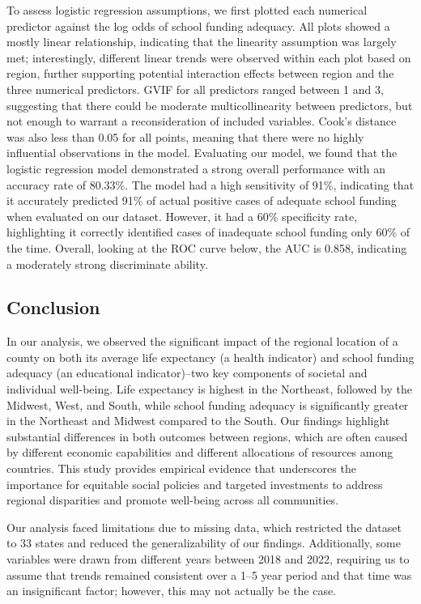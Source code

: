\documentclass[
  10pt,
  letterpaper,
  DIV=11,
  numbers=noendperiod]{scrartcl}
\begin{document}
To assess logistic regression assumptions, we first plotted each
numerical predictor against the log odds of school funding adequacy. All
plots showed a mostly linear relationship, indicating that the linearity
assumption was largely met; interestingly, different linear trends were
observed within each plot based on region, further supporting potential
interaction effects between region and the three numerical predictors.
GVIF for all predictors ranged between 1 and 3, suggesting that there
could be moderate multicollinearity between predictors, but not enough
to warrant a reconsideration of included variables. Cook's distance was
also less than 0.05 for all points, meaning that there were no highly
influential observations in the model. Evaluating our model, we found
that the logistic regression model demonstrated a strong overall
performance with an accuracy rate of 80.33\%. The model had a high
sensitivity of 91\%, indicating that it accurately predicted 91\% of
actual positive cases of adequate school funding when evaluated on our
dataset. However, it had a 60\% specificity rate, highlighting it
correctly identified cases of inadequate school funding only 60\% of the
time. Overall, looking at the ROC curve below, the AUC is 0.858,
indicating a moderately strong discriminate ability.~

\subsection{\texorpdfstring{\textbf{Conclusion}}{Conclusion}}\label{conclusion}

In our analysis, we observed the significant impact of the regional
location of a county on both its average life expectancy (a health
indicator) and school funding adequacy (an educational indicator)--two
key components of societal and individual well-being. Life expectancy is
highest in the Northeast, followed by the Midwest, West, and South,
while school funding adequacy is significantly greater in the Northeast
and Midwest compared to the South. Our findings highlight substantial
differences in both outcomes between regions, which are often caused by
different economic capabilities and different allocations of resources
among countries. This study provides empirical evidence that underscores
the importance for equitable social policies and targeted investments to
address regional disparities and promote well-being across all
communities.

Our analysis faced limitations due to missing data, which restricted the
dataset to 33 states and reduced the generalizability of our findings.
Additionally, some variables were drawn from different years between
2018 and 2022, requiring us to assume that trends remained consistent
over a 1--5 year period and that time was an insignificant factor;
however, this may not actually be the case.
\end{document}
